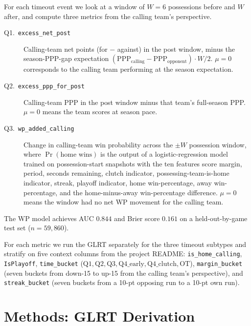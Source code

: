 \documentclass[twoside,11pt]{article}
\begin{document}
For each timeout event we look at a window of $W=6$ possessions before and
$W$ after, and compute three metrics from the calling team's perspective.
\begin{description}
		\item[Q1.~\texttt{excess\_net\_post}] Calling-team net points (for $-$ against)
				in the post window, minus the season-PPP-gap expectation
				$(\mathrm{PPP}_{\text{calling}} - \mathrm{PPP}_{\text{opponent}})\cdot W/2$.
				$\mu = 0$ corresponds to the calling team performing at the season expectation.
		\item[Q2.~\texttt{excess\_ppp\_for\_post}] Calling-team PPP in the post window
				minus that team's full-season PPP. $\mu = 0$ means the team scores at
				season pace.
		\item[Q3.~\texttt{wp\_added\_calling}] Change in calling-team win probability
				across the $\pm W$ possession window, where $\Pr(\text{home wins})$ is the
				output of a logistic-regression model trained on possession-start snapshots
				with the ten features score margin, period, seconds remaining,
				clutch indicator, possessing-team-is-home indicator, streak,
				playoff indicator, home win-percentage, away win-percentage, and the
				home-minus-away win-percentage difference. $\mu = 0$ means
				the window had no net WP movement for the calling team.
\end{description}
The WP model achieves AUC $0.844$ and Brier score $0.161$ on a
held-out-by-game test set ($n=59{,}860$).

For each metric we run the GLRT separately for the three timeout subtypes
and stratify on five context columns from the project README:
\texttt{is\_home\_calling}, \texttt{IsPlayoff}, \texttt{time\_bucket}
($\text{Q1}, \text{Q2}, \text{Q3}, \text{Q4\_early}, \text{Q4\_clutch},
\text{OT}$), \texttt{margin\_bucket} (seven buckets from down-15 to up-15
from the calling team's perspective), and \texttt{streak\_bucket} (seven
buckets from a 10-pt opposing run to a 10-pt own run).

\section{Methods: GLRT Derivation}
\label{sec:method}
\end{document}

